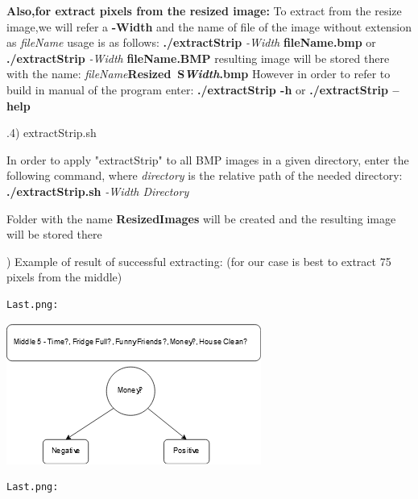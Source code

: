 \documentclass{article}
\begin{document}
\textbf{Also,for extract pixels from the resized image:}
To extract from the resize image,we will refer 
a  \textbf{ -Width} and the name of file of the image without extension as \textit{fileName} usage is as follows:\newline
\indent\textbf{./extractStrip }\textit{-Width}  \textbf{fileName.bmp}\newline
or\newline
\indent\textbf{./extractStrip}\textit{ -Width} \textbf{fileName.BMP}\newline
 resulting image will be stored there with the name:\newline
\indent \textit{  fileName}\textbf{Resized\textunderscore\
S\textit{Width}}\textit{}\textbf{.bmp}\newline
However in order to refer to build in manual of the program enter:\newline
\indent\textbf{./extractStrip -h}\newline
or\newline
\indent\textbf{./extractStrip  --help}

.4) extractStrip.sh

In order to apply "extractStrip" to all BMP images in a given directory, enter the following command, where \textit{directory} is the relative path of the needed directory:\newline
\indent \textbf{./extractStrip.sh }\textit{-Width Directory}  

Folder with the name \textbf{ResizedImages} will be created and the resulting image will be stored there

) Example of result of successful extracting: (for our case  is best to extract 75 pixels from the middle)

\parindent=0cm

\begin{minipage}{0.5\textwidth}
\begin{verbatim}
Last.png:
\end{verbatim}
\begin{center}
\includegraphics[scale=1]{Middle.png}
\end{center}
\end{minipage}
\begin{minipage}{0.5\textwidth}
\begin{verbatim}
Last.png:
\end{verbatim}
\end{minipage}
\parindent=1.5cm
\newline
\newline
\newline
\end{document}
